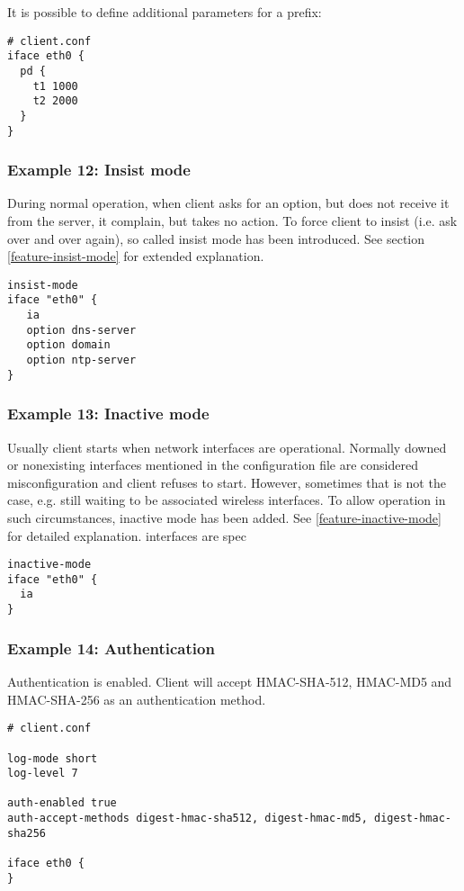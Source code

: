 It is possible to define additional parameters for a prefix:

\begin{lstlisting}
# client.conf
iface eth0 {
  pd {
    t1 1000
    t2 2000
  }
}
\end{lstlisting}

\subsubsection{Example 12: Insist mode}
\label{example-client-insistmode}
During normal operation, when client asks for an option, but does not
receive it from the server, it complain, but takes no action. To force
client to insist (i.e. ask over and over again), so called insist mode
has been introduced. See section \ref{feature-insist-mode} for
extended explanation.

\begin{lstlisting}
insist-mode
iface "eth0" {
   ia
   option dns-server
   option domain
   option ntp-server
}
\end{lstlisting}

\subsubsection{Example 13: Inactive mode}
\label{example-client-inactivemode}
Usually client starts when network interfaces are
operational. Normally downed or nonexisting interfaces mentioned in
the configuration file are considered misconfiguration and client
refuses to start. However, sometimes that is not the case, e.g. still
waiting to be associated wireless interfaces. To allow operation in
such circumstances, inactive mode has been added. See
\ref{feature-inactive-mode} for detailed explanation.
interfaces are spec

\begin{lstlisting}
inactive-mode
iface "eth0" {
  ia
}
\end{lstlisting}

\subsubsection{Example 14: Authentication}
\label{example-client-auth}
Authentication is enabled. Client will accept HMAC-SHA-512, HMAC-MD5
and HMAC-SHA-256 as an authentication method.

\begin{lstlisting}
# client.conf

log-mode short
log-level 7

auth-enabled true
auth-accept-methods digest-hmac-sha512, digest-hmac-md5, digest-hmac-sha256

iface eth0 {
}
\end{lstlisting}

